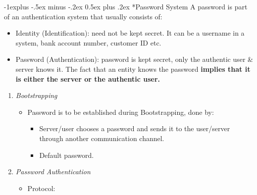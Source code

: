 \documentclass[10pt,landscape]{article}
\makeatletter
\renewcommand{\subsection}{\@startsection{subsection}{2}{0mm}%
                                {-1explus -.5ex minus -.2ex}%
                                {0.5ex plus .2ex}%
                                {\normalfont\normalsize\bfseries}}
\makeatother
\begin{document}
\begin{multicols*}{3}
\subsection*{Password System}
A password is part of an authentication system that usually consists of:
\begin{itemize}[noitemsep,wide=0pt, leftmargin=\dimexpr{} + 2\relax]
    \item Identity (Identification): need not be kept secret. It can be a username in a system, bank account number, customer ID etc.
    \item Password (Authentication): password is kept secret, only the authentic user \& server knows it. The fact that an entity knows the password \textbf{implies that it is either the server or the authentic user.}
\end{itemize}
\begin{enumerate}[noitemsep,wide=0pt, leftmargin=\dimexpr\labelwidth + 2\labelsep\relax]
    \item \textit{Bootstrapping}
        \begin{itemize}[noitemsep,wide=0pt, leftmargin=\dimexpr{} + 2\relax]
            \item Password is to be established during Bootstrapping, done by:
            \begin{itemize}[noitemsep,wide=0pt, leftmargin=\dimexpr{} + 2\relax]
                \item Server/user chooses a password and sends it to the user/server through another communication channel.
                \item Default password.
            \end{itemize}
        \end{itemize}
    \item \textit{Password Authentication}
        \begin{itemize}[noitemsep,wide=0pt, leftmargin=\dimexpr{} + 2\relax]
            \item Protocol:  \newline

\end{itemize}
\end{enumerate}
\end{multicols*}
\end{document}
